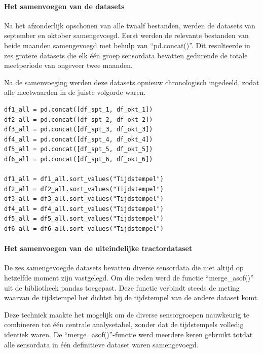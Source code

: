 \newpage

\paragraph{Het samenvoegen van de datasets}

Na het afzonderlijk opschonen van alle twaalf bestanden, werden de datasets van september en oktober samengevoegd. Eerst werden de relevante bestanden van beide maanden samengevoegd met behulp van ``pd.concat()''. Dit resulteerde in zes grotere datasets die elk één groep sensordata bevatten gedurende de totale meetperiode van ongeveer twee maanden.

Na de samenvoeging werden deze datasets opnieuw chronologisch ingedeeld, zodat alle meetwaarden in de juiste volgorde waren.

\begin{listing}[H]
\begin{verbatim}
df1_all = pd.concat([df_spt_1, df_okt_1])
df2_all = pd.concat([df_spt_2, df_okt_2])
df3_all = pd.concat([df_spt_3, df_okt_3])
df4_all = pd.concat([df_spt_4, df_okt_4])
df5_all = pd.concat([df_spt_5, df_okt_5])
df6_all = pd.concat([df_spt_6, df_okt_6])

df1_all = df1_all.sort_values("Tijdstempel")
df2_all = df2_all.sort_values("Tijdstempel")
df3_all = df3_all.sort_values("Tijdstempel")
df4_all = df4_all.sort_values("Tijdstempel")
df5_all = df5_all.sort_values("Tijdstempel")
df6_all = df6_all.sort_values("Tijdstempel")
\end{verbatim}
\caption[Code snippet: samenvoegen en sorteren tractordata]{Regels code om de datasets samen te voegen en te sorteren.}
\end{listing}

\newpage

\paragraph{Het samenvoegen van de uiteindelijke tractordataset}

De zes samengevoegde datasets bevatten diverse sensordata die niet altijd op hetzelfde moment zijn vastgelegd. Om die reden werd de functie ``merge\_asof()'' uit de bibliotheek pandas toegepast. Deze functie verbindt steeds de meting waarvan de tijdstempel het dichtst bij de tijdstempel van de andere dataset komt.

Deze techniek maakte het mogelijk om de diverse sensorgroepen nauwkeurig te combineren tot één centrale analysetabel, zonder dat de tijdstempels volledig identiek waren. De ``merge\_asof()''-functie werd meerdere keren gebruikt totdat alle sensordata in één definitieve dataset waren samengevoegd.

